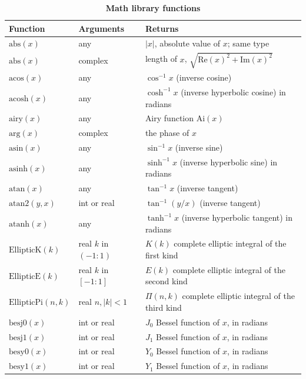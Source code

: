 \begin{center}
    \begin{longtable}{lll}
        \caption{\textbf{Math library functions}}\\
        \toprule
        \textbf{Function} & \textbf{Arguments} & \textbf{Returns} \\
        \midrule
        \(\text{abs}(x)\) & any & $|x|$, absolute value of $x$; same type \\
        \(\text{abs}(x)\) & complex & length of $x$, $\sqrt{\text{Re}(x)^2 + \text{Im}(x)^2}$ \\
        \(\text{acos}(x)\) & any & $\cos^{-1} x$ (inverse cosine) \\
        \(\text{acosh}(x)\) & any & $\cosh^{-1} x$ (inverse hyperbolic cosine) in radians \\
        \(\text{airy}(x)\) & any & Airy function $\text{Ai}(x)$ \\
        \(\text{arg}(x)\) & complex & the phase of $x$ \\
        \(\text{asin}(x)\) & any & $\sin^{-1} x$ (inverse sine) \\
        \(\text{asinh}(x)\) & any & $\sinh^{-1} x$ (inverse hyperbolic sine) in radians \\
        \(\text{atan}(x)\) & any & $\tan^{-1} x$ (inverse tangent) \\
        \(\text{atan2}(y,x)\) & int or real & $\tan^{-1}(y/x)$ (inverse tangent) \\
        \(\text{atanh}(x)\) & any & $\tanh^{-1} x$ (inverse hyperbolic tangent) in radians \\
        \(\text{EllipticK}(k)\) & real  $k$ in $(-1:1)$ & $K(k)$ complete elliptic integral of the first kind \\
        \(\text{EllipticE}(k)\) & real  $k$ in $[-1:1]$ & $E(k)$ complete elliptic integral of the second kind \\
        \(\text{EllipticPi}(n,k)\) & real $n,|k|<1$ & $\Pi(n,k)$ complete elliptic integral of the third kind \\
        \(\text{besj0}(x)\) & int or real & $J_0$ Bessel function of $x$, in radians \\
        \(\text{besj1}(x)\) & int or real & $J_1$ Bessel function of $x$, in radians \\
        \(\text{besy0}(x)\) & int or real & $Y_0$ Bessel function of $x$, in radians \\
        \(\text{besy1}(x)\) & int or real & $Y_1$ Bessel function of $x$, in radians \\

\end{longtable}
\end{center}
